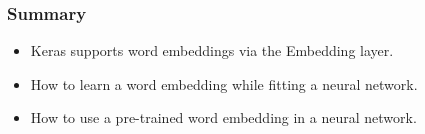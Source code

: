 \begin{frame}[fragile]\frametitle{Summary}

\begin{itemize}
\item Keras supports word embeddings via the Embedding layer.
\item How to learn a word embedding while fitting a neural network.
\item How to use a pre-trained word embedding in a neural network.
\end{itemize}


\end{frame}